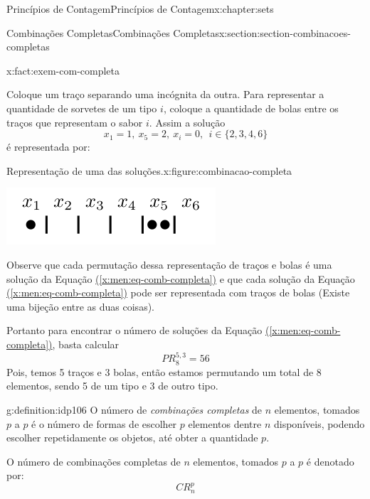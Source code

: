 \documentclass[oneside,10pt,]{book}
\newcommand{\xreffont}{\relax}
\numberwithin{equation}{section}
\begin{document}
\begin{chapterptx}{Princípios de Contagem}{}{Princípios de Contagem}{}{}{x:chapter:sets}
\begin{sectionptx}{Combinações Completas}{}{Combinações Completas}{}{}{x:section:section-combinacoes-completas}
\begin{fact}{}{}{x:fact:exem-com-completa}
\par
Coloque um traço separando uma incógnita da outra. Para representar a quantidade de sorvetes de um tipo \(i\), coloque a quantidade de bolas entre os traços que representam o sabor \(i\). Assim a solução%
\begin{equation*}
x_1=1, ~ x_5=2, ~ x_i=0, ~~ i\in \{2, 3, 4, 6\} 
\end{equation*}
é representada por:%
\begin{figureptx}{Representação de uma das soluções.}{x:figure:combinacao-completa}{}%
\begin{image}{0.3}{0.4}{0.3}%
\includegraphics[width=\linewidth]{images/combinacaocompleta}
\end{image}%
\tcblower
\end{figureptx}%
Observe que cada permutação dessa representação de traços e bolas é uma solução da Equação \hyperref[x:men:eq-comb-completa]{({\xreffont\ref{x:men:eq-comb-completa}})} e que cada solução da Equação \hyperref[x:men:eq-comb-completa]{({\xreffont\ref{x:men:eq-comb-completa}})} pode ser representada com traços de bolas (Existe uma bijeção entre as duas coisas).%
\par
Portanto para encontrar o número de soluções da Equação \hyperref[x:men:eq-comb-completa]{({\xreffont\ref{x:men:eq-comb-completa}})}, basta calcular%
\begin{equation*}
PR_8^{5, 3} = 56 
\end{equation*}
Pois, temos 5 traços e 3 bolas, então estamos permutando um total de 8 elementos, sendo 5 de um tipo e 3 de outro tipo.%
\end{fact}
\begin{definition}{}{g:definition:idp106}%
O número de \emph{combinações completas} de \(n\) elementos, tomados \(p\) a \(p\) é o número de formas de escolher \(p\) elementos dentre \(n\) disponíveis, podendo escolher repetidamente os objetos, até obter a quantidade \(p\).%
\par
O número de combinações completas de \(n\) elementos, tomados \(p\) a \(p\) é denotado por:%
\begin{equation*}
CR_n^{p} 
\end{equation*}

\end{definition}
\end{sectionptx}
\end{chapterptx}
\end{document}
